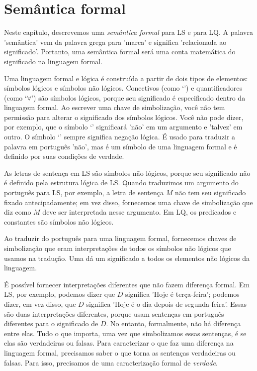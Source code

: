 \chapter{Semântica formal}
\label{ch.semantics}

Neste capítulo, descrevemos uma \emph{semântica formal} para LS e para LQ. A palavra 'semântica' vem da palavra grega para 'marca' e significa 'relacionada ao significado'. Portanto, uma semântica formal será uma conta matemática do significado na linguagem formal.

Uma linguagem formal e lógica é construída a partir de dois tipos de elementos: símbolos lógicos e símbolos não lógicos. Conectivos (como `\eand') e quantificadores (como `$\forall$') são símbolos lógicos, porque seu significado é especificado dentro da linguagem formal. Ao escrever uma chave de simbolização, você não tem permissão para alterar o significado dos símbolos lógicos. Você não pode dizer, por exemplo, que o símbolo `\enot' significará 'não' em um argumento e 'talvez' em outro. O símbolo `\enot' sempre significa negação lógica. É usado para traduzir a palavra em português 'não', mas é um símbolo de uma linguagem formal e é definido por suas condições de verdade.

As letras de sentença em LS são símbolos não lógicos, porque seu significado não é definido pela estrutura lógica de LS. Quando traduzimos um argumento do português para LS, por exemplo, a letra de sentença $M$ não tem seu significado fixado antecipadamente; em vez disso, fornecemos uma chave de simbolização que diz como $M$ deve ser interpretada nesse argumento. Em LQ, os predicados e constantes são símbolos não lógicos.

Ao traduzir do português para uma linguagem formal, fornecemos chaves de simbolização que eram interpretações de todos os símbolos não lógicos que usamos na tradução. Uma  dá um significado a todos os elementos não lógicos da linguagem.

É possível fornecer interpretações diferentes que não fazem diferença formal. Em LS, por exemplo, podemos dizer que $D$ significa 'Hoje é terça-feira'; podemos dizer, em vez disso, que $D$ significa 'Hoje é o dia depois de segunda-feira'. Essas são duas interpretações diferentes, porque usam sentenças em português diferentes para o significado de $D$. No entanto, formalmente, não há diferença entre elas. Tudo o que importa, uma vez que simbolizamos essas sentenças, é se elas são verdadeiras ou falsas. Para caracterizar o que faz uma diferença na linguagem formal, precisamos saber o que torna as sentenças verdadeiras ou falsas. Para isso, precisamos de uma caracterização formal de \emph{verdade}.


